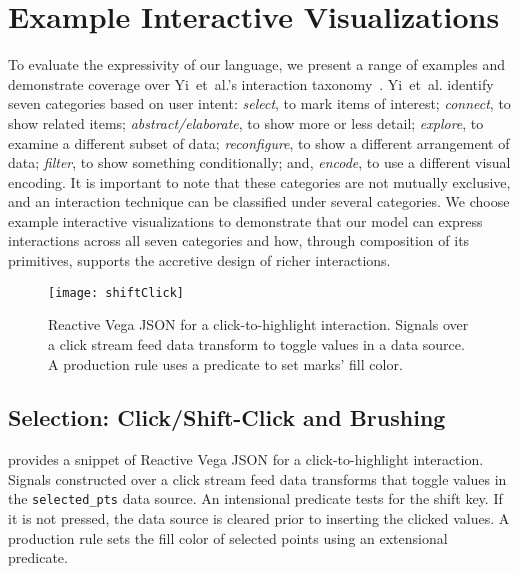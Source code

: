 \section{Example Interactive Visualizations}
\label{sec:vg:examples}

\vspace{-10pt}

To evaluate the expressivity of our language, we present a range of examples and
demonstrate coverage over Yi~et~al.'s interaction
taxonomy~\cite{yi:understanding}. Yi~et~al. identify seven categories based on
user intent: \emph{select}, to mark items of interest; \emph{connect}, to show
related items; \emph{abstract/elaborate}, to show more or less detail;
\emph{explore}, to examine a different subset of data; \emph{reconfigure}, to
show a different arrangement of data; \emph{filter}, to show something
conditionally; and, \emph{encode}, to use a different visual encoding. It is
important to note that these categories are not mutually exclusive, and an
interaction technique can be classified under several categories. We choose
example interactive visualizations to demonstrate that our model can express
interactions across all seven categories and how, through composition of its
primitives, supports the accretive design of richer interactions.

\begin{figure}[h!]
  \centering
  \texttt{[image: shiftClick]}
  \caption{Reactive Vega JSON for a click-to-highlight interaction. Signals over
  a click stream feed data transform to toggle values in a data source. A
  production rule uses a predicate to set marks' fill color.}
  \label{fig:vg:shiftClick}
\end{figure}

\vspace{-20pt}

\subsection{Selection: Click/Shift-Click and Brushing}

\vspace{-7pt}

 provides a snippet of Reactive Vega JSON for a
click-to-highlight interaction. Signals constructed over a click stream feed
data transforms that toggle values in the \texttt{selected\_pts} data source. An
intensional predicate tests for the shift key. If it is not pressed, the data
source is cleared prior to inserting the clicked values. A production rule sets
the fill color of selected points using an extensional predicate.

